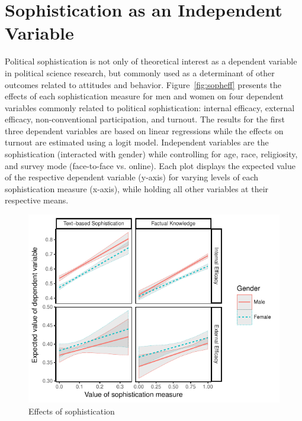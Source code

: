 \documentclass[12pt]{article}
\begin{document}
\section*{Sophistication as an Independent Variable}

Political sophistication is not only of theoretical interest as a dependent variable in political science research, but commonly used as a determinant of other outcomes related to attitudes and behavior. Figure~\ref{fig:sopheff} presents the effects of each sophistication measure for men and women on four dependent variables commonly related to political sophistication: internal efficacy, external efficacy, non-conventional participation, and turnout. The results for the first three dependent variables are based on linear regressions while the effects on turnout are estimated using a logit model. Independent variables are the sophistication (interacted with gender) while controlling for age, race, religiosity, and survey mode (face-to-face vs. online). Each plot displays the expected value of the respective dependent variable (y-axis) for varying levels of each sophistication measure (x-axis), while holding all other variables at their respective means.

\begin{figure}[h]\centering
\includegraphics{../fig/efficacy.pdf}
\caption{Effects of sophistication}\label{fig:efficacy}
\end{figure}
\end{document}
